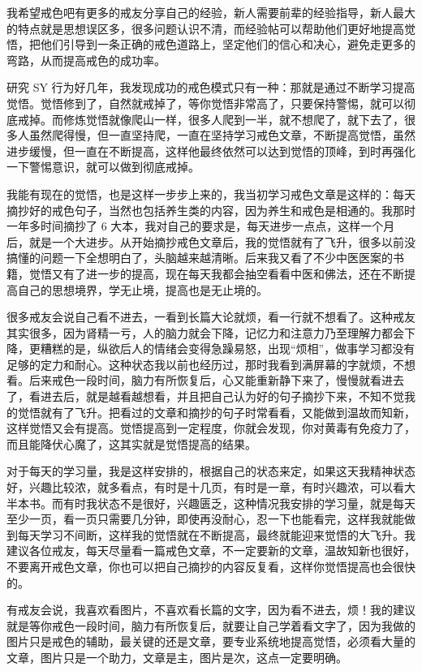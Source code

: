 \documentclass[fontset=founder]{ctexart}
\begin{document}
我希望戒色吧有更多的戒友分享自己的经验，新人需要前辈的经验指导，新人最大的特点就是思想误区多，很多问题认识不清，而经验帖可以帮助他们更好地提高觉悟，把他们引导到一条正确的戒色道路上，坚定他们的信心和决心，避免走更多的弯路，从而提高戒色的成功率。

研究 SY 行为好几年，我发现成功的戒色模式只有一种：那就是通过不断学习提高觉悟。觉悟修到了，自然就戒掉了，等你觉悟非常高了，只要保持警惕，就可以彻底戒掉。而修炼觉悟就像爬山一样，很多人爬到一半，就不想爬了，就下去了，很多人虽然爬得慢，但一直坚持爬，一直在坚持学习戒色文章，不断提高觉悟，虽然进步缓慢，但一直在不断提高，这样他最终依然可以达到觉悟的顶峰，到时再强化一下警惕意识，就可以做到彻底戒掉。

我能有现在的觉悟，也是这样一步步上来的，我当初学习戒色文章是这样的：每天摘抄好的戒色句子，当然也包括养生类的内容，因为养生和戒色是相通的。我那时一年多时间摘抄了 6 大本，我对自己的要求是，每天进步一点点，这样一个月后，就是一个大进步。从开始摘抄戒色文章后，我的觉悟就有了飞升，很多以前没搞懂的问题一下全想明白了，头脑越来越清晰。后来我又看了不少中医医案的书籍，觉悟又有了进一步的提高，现在每天我都会抽空看看中医和佛法，还在不断提高自己的思想境界，学无止境，提高也是无止境的。

很多戒友会说自己看不进去，一看到长篇大论就烦，看一行就不想看了。这种戒友其实很多，因为肾精一亏，人的脑力就会下降，记忆力和注意力乃至理解力都会下降，更糟糕的是，纵欲后人的情绪会变得急躁易怒，出现“烦相”，做事学习都没有足够的定力和耐心。这种状态我以前也经历过，那时我看到满屏幕的字就烦，不想看。后来戒色一段时间，脑力有所恢复后，心又能重新静下来了，慢慢就看进去了，看进去后，就是越看越想看，并且把自己认为好的句子摘抄下来，不知不觉我的觉悟就有了飞升。把看过的文章和摘抄的句子时常看看，又能做到温故而知新，这样觉悟又会有提高。觉悟提高到一定程度，你就会发现，你对黄毒有免疫力了，而且能降伏心魔了，这其实就是觉悟提高的结果。

对于每天的学习量，我是这样安排的，根据自己的状态来定，如果这天我精神状态好，兴趣比较浓，就多看点，有时是十几页，有时是一章，有时兴趣浓，可以看大半本书。而有时我状态不是很好，兴趣匮乏，这种情况我安排的学习量，就是每天至少一页，看一页只需要几分钟，即使再没耐心，忍一下也能看完，这样我就能做到每天学习不间断，这样我的觉悟就在不断提高，最终就能迎来觉悟的大飞升。我建议各位戒友，每天尽量看一篇戒色文章，不一定要新的文章，温故知新也很好，不要离开戒色文章，你也可以把自己摘抄的内容反复看，这样你觉悟提高也会很快的。

有戒友会说，我喜欢看图片，不喜欢看长篇的文字，因为看不进去，烦！我的建议就是等你戒色一段时间，脑力有所恢复后，就要让自己学着看文字了，因为我做的图片只是戒色的辅助，最关键的还是文章，要专业系统地提高觉悟，必须看大量的文章，图片只是一个助力，文章是主，图片是次，这点一定要明确。
\end{document}
